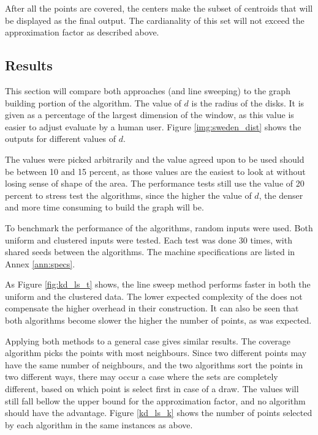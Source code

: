 

After all the points are covered, the centers make the subset of centroids that will be displayed as the final output. The cardianality of this set will not exceed the approximation factor as described above.


\subsection{Results}
This section will compare both approaches (\kdtrees and line sweeping) to the graph building portion of the algorithm. The value of $d$ is the radius of the disks. It is given as a percentage of the largest dimension of the window, as this value is easier to adjust evaluate by a human user. Figure \ref{img:sweden_dist} shows the outputs for different values of $d$.


The values were picked arbitrarily and the value agreed upon to be used should be between 10 and 15 percent, as those values are the easiest to look at without losing sense of shape of the area. The performance tests still use the value of 20 percent to stress test the algorithms, since the higher the value of $d$, the denser and more time consuming to build the graph will be.

To benchmark the performance of the algorithms, random inputs were used. Both uniform and clustered inputs were tested. Each test was done 30 times, with shared seeds between the algorithms. The machine specifications are listed in Annex \ref{ann:specs}.



As Figure \ref{fig:kd_ls_t} shows, the line sweep method performs faster in both the uniform and the clustered data. The lower expected complexity of the \kdtrees does not compensate the higher overhead in their construction. It can also be seen that both algorithms become slower the higher the number of points, as was expected.

Applying both methods to a general case gives similar results. The coverage algorithm picks the points with most neighbours. Since two different points may have the same number of neighbours, and the two algorithms sort the points in two different ways, there may occur a case where the sets are completely different, based on which point is select first in case of a draw. The values will still fall bellow the upper bound for the approximation factor, and no algorithm should have the advantage. Figure \ref{kd_ls_k} shows the number of points selected by each algorithm in the same instances as above.

